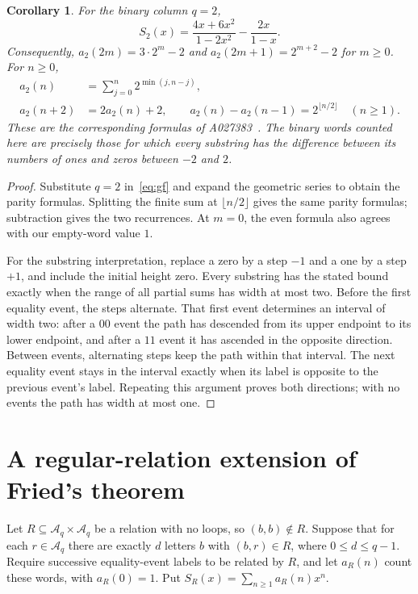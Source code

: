\documentclass[11pt]{article}
\newtheorem{corollary}[theorem]{Corollary}
\begin{document}
\begin{corollary}\label{cor:binary}
For the binary column $q=2$,
\[
 S_2(x)=\frac{4x+6x^2}{1-2x^2}-\frac{2x}{1-x}.
\]
Consequently, $a_2(2m)=3\cdot2^m-2$ and
$a_2(2m+1)=2^{m+2}-2$ for $m\geq0$. For $n\geq0$,
\begin{align*}
 a_2(n)&=\sum_{j=0}^n 2^{\min(j,n-j)},\\
 a_2(n+2)&=2a_2(n)+2,\qquad
 a_2(n)-a_2(n-1)=2^{\lfloor n/2\rfloor}\quad(n\geq1).
\end{align*}
These are the corresponding formulas of A027383~\cite{binary}.
The binary words counted here are precisely those for which every substring
has the difference between its numbers of ones and zeros between $-2$ and $2$.
\end{corollary}
\begin{proof}
Substitute $q=2$ in~\eqref{eq:gf} and expand the geometric series to obtain
the parity formulas. Splitting the finite sum at $\lfloor n/2\rfloor$
gives the same parity formulas; subtraction gives the two recurrences.
At $m=0$, the even formula also agrees with our empty-word value $1$.

For the substring interpretation, replace a zero by a step $-1$ and a one
by a step $+1$, and include the initial height zero. Every substring has
the stated bound exactly when the range of all partial sums has width at
most two. Before the first equality event, the steps alternate. That first
event determines an interval of width two: after a $00$ event the path
has descended from its upper endpoint to its lower endpoint, and after a
$11$ event it has ascended in the opposite direction. Between events,
alternating steps keep the path within that interval. The next equality
event stays in the interval exactly when its label is opposite to the
previous event's label. Repeating this argument proves both directions;
with no events the path has width at most one.
\end{proof}

\section{A regular-relation extension of Fried's theorem}
Let $R\subseteq\mathcal A_q\times\mathcal A_q$ be a relation with no
loops, so $(b,b)\notin R$. Suppose that for each $r\in\mathcal A_q$
there are exactly $d$ letters $b$ with $(b,r)\in R$, where
$0\leq d\leq q-1$. Require successive equality-event labels to be related
by $R$, and let $a_R(n)$ count these words, with $a_R(0)=1$.
Put $S_R(x)=\sum_{n\geq1}a_R(n)x^n$.
\end{document}
